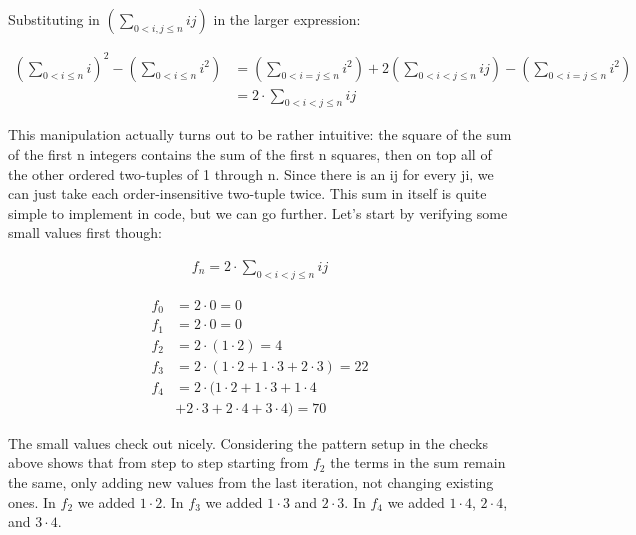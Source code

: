 \documentclass{article}
\begin{document}
Substituting in $\left( \sum_{0 < i, j \le n} i j \right)$
in the larger expression:

\begin{align*}
    \left( \sum_{0 < i \le n} i \right)^2 
    - \left(\sum_{0 < i \le n} i^2\right) &=
    \left(\sum_{0 < i = j \le n} i^2\right)
    + 2 \left(\sum_{0 < i < j \le n} i j\right)
    - \left(\sum_{0 < i = j \le n} i^2\right)
    \\
    &= 2 \cdot \sum_{0 < i < j \le n} i j
\end{align*}

This manipulation actually turns out to be rather intuitive: the square of
the sum of the first n integers contains the sum of the first n squares,
then on top all of the other ordered two-tuples of 1 through n.  Since
there is an ij for every ji, we can just take each order-insensitive
two-tuple twice.  This sum in itself is quite simple to implement in code,
but we can go further.  Let's start by verifying some small values first though:

\begin{align*}
    f_n = 2 \cdot \sum_{0 < i < j \le n} i j
\end{align*}

\begin{align*}
    f_0 &= 2 \cdot 0 = 0 \\
    f_1 &= 2 \cdot 0 = 0 \\
    f_2 &= 2 \cdot (1 \cdot 2) = 4 \\
    f_3 &= 2 \cdot (1 \cdot 2 + 1 \cdot 3 + 2 \cdot 3) = 22 \\
    f_4 &= 2 \cdot (1 \cdot 2 + 1 \cdot 3 + 1 \cdot 4 \\
    & + 2 \cdot 3 + 2 \cdot 4 + 3 \cdot 4) = 70
\end{align*}

The small values check out nicely.  Considering the pattern setup in the checks
above shows that from step to step starting from $f_2$ the terms in the sum
remain the same, only adding new values from the last iteration, not changing
existing ones.  In $f_2$ we added $1 \cdot 2$.  In $f_3$ we added
$1 \cdot 3$ and $2 \cdot 3$.  In $f_4$ we added $1 \cdot 4$, $2 \cdot 4$,
and $3 \cdot 4$.
\end{document}
